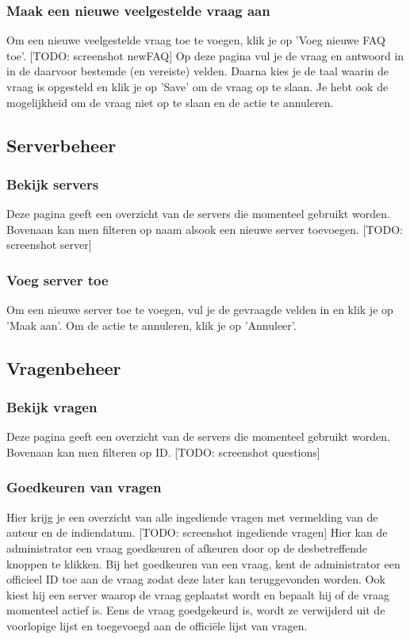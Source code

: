 \documentclass[]{article}
\begin{document}
\subsubsection{Maak een nieuwe veelgestelde vraag aan}
Om een nieuwe veelgestelde vraag toe te voegen, klik je op 'Voeg nieuwe FAQ toe'. [TODO: screenshot newFAQ] Op deze pagina vul je de vraag en antwoord in in de daarvoor bestemde (en vereiste) velden. Daarna kies je de taal waarin de vraag is opgesteld en klik je op 'Save' om de vraag op te slaan. Je hebt ook de mogelijkheid om de vraag niet op te slaan en de actie te annuleren.

\subsection{Serverbeheer}

\subsubsection{Bekijk servers}
Deze pagina geeft een overzicht van de servers die momenteel gebruikt worden. Bovenaan kan men filteren op naam alsook een nieuwe server toevoegen. [TODO: screenshot server]

\subsubsection{Voeg server toe}
Om een nieuwe server toe te voegen, vul je de gevraagde velden in en klik je op 'Maak aan'. Om de actie te annuleren, klik je op 'Annuleer'.

\subsection{Vragenbeheer}

\subsubsection{Bekijk vragen}
Deze pagina geeft een overzicht van de servers die momenteel gebruikt worden. Bovenaan kan men filteren op ID. [TODO: screenshot questions]

\subsubsection{Goedkeuren van vragen}
Hier krijg je een overzicht van alle ingediende vragen met vermelding van de auteur en de indiendatum. [TODO: screenshot ingediende vragen] Hier kan de administrator een vraag goedkeuren of afkeuren door op de desbetreffende knoppen te klikken. Bij het goedkeuren van een vraag, kent de administrator een officieel ID toe aan de vraag zodat deze later kan teruggevonden worden. Ook kiest hij een server waarop de vraag geplaatst wordt en bepaalt hij of de vraag momenteel actief is. Eens de vraag goedgekeurd is, wordt ze verwijderd uit de voorlopige lijst en toegevoegd aan de officiële lijst van vragen.
\end{document}
